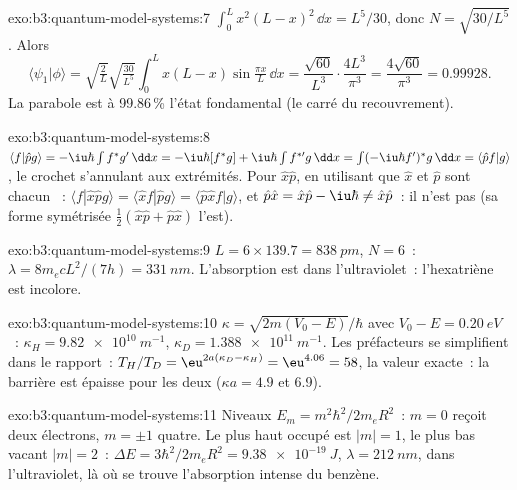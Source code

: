 \begin{solution}{exo:b3:quantum-model-systems:7}
$\int_0^Lx^2(L - x)^2\,\dd x = L^5/30$, donc $N = \sqrt{30/L^5}$. Alors
\[
\langle\psi_1|\phi\rangle = \sqrt{\tfrac2L}\sqrt{\tfrac{30}{L^5}}\int_0^Lx(L -
x)\sin\tfrac{\pi x}{L}\,\dd x = \frac{\sqrt{60}}{L^3}\cdot\frac{4L^3}{\pi^3} =
\frac{4\sqrt{60}}{\pi^3} = 0.99928 .
\]
La parabole est à 99.86\,\% l'état fondamental (le carré du recouvrement).
\end{solution}

\begin{solution}{exo:b3:quantum-model-systems:8}
$\langle f|\hat pg\rangle = -\iu\hbar\int f^*g'\,\dd x = -\iu\hbar[f^*g] +
\iu\hbar\int f^{*\prime}g\,\dd x = \int(-\iu\hbar f')^*g\,\dd x = \langle\hat
pf|g\rangle$, le crochet s'annulant aux extrémités. Pour $\hat x\hat p$, en
utilisant que $\hat x$ et $\hat p$ sont chacun ~:
$\langle f|\hat x\hat pg\rangle = \langle\hat xf|\hat pg\rangle = \langle\hat p\hat
xf|g\rangle$, et $\hat p\hat x = \hat x\hat p - \iu\hbar \ne \hat x\hat p$~: il
n'est pas  (sa forme symétrisée $\frac12(\hat x\hat p + \hat p\hat x)$ l'est).
\end{solution}

\begin{solution}{exo:b3:quantum-model-systems:9}
$L = 6 \times 139.7 = \qty{838}{pm}$, $N = 6$~: $\lambda = 8m_ecL^2/(7h) =
\qty{331}{nm}$. L'absorption est dans l'ultraviolet~: l'hexatriène est
incolore.
\end{solution}

\begin{solution}{exo:b3:quantum-model-systems:10}
$\kappa = \sqrt{2m(V_0 - E)}/\hbar$ avec $V_0 - E = \qty{0.20}{eV}$~:
$\kappa_H = \qty{9.82e10}{m^{-1}}$, $\kappa_D = \qty{1.388e11}{m^{-1}}$. Les
préfacteurs se simplifient dans le rapport~: $T_H/T_D = \eu^{2a(\kappa_D - \kappa_H)} =
\eu^{4.06} = 58$, la valeur exacte~: la barrière est épaisse pour les deux
($\kappa a = 4.9$ et 6.9).
\end{solution}

\begin{solution}{exo:b3:quantum-model-systems:11}
Niveaux $E_m = m^2\hbar^2/2m_eR^2$~: $m = 0$ reçoit deux électrons, $m = \pm1$
quatre. Le plus haut occupé est $|m| = 1$, le plus bas vacant $|m| = 2$~: $\Delta E =
3\hbar^2/2m_eR^2 = \qty{9.38e-19}{J}$, $\lambda = \qty{212}{nm}$, dans
l'ultraviolet, là où se trouve l'absorption intense du benzène.
\end{solution}

